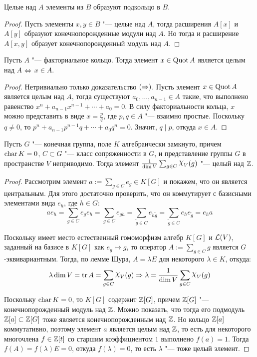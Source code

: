 \begin{corollary}
	Целые над $A$ элементы из $B$ образуют подкольцо в $B$.
\end{corollary}

\begin{proof}
	Пусть элементы $x, y \in B$ "--- целые над $A$, тогда расширения $A[x]$ и $A[y]$ образуют конечнопорожденные модули над $A$. Но тогда и расширение $A[x, y]$ образует конечнопорожденный модуль над $A$.
\end{proof}

\begin{proposition}
	Пусть $A$ "--- факториальное кольцо. Тогда элемент $x \in \operatorname{Quot}{A}$ является целым над $A$ $\Leftrightarrow$ $x \in A$.
\end{proposition}

\begin{proof}
	Нетривиально только доказательство $(\Rightarrow)$. Пусть элемент $x \in \operatorname{Quot}{A}$ является целым над $A$, тогда существуют $a_0, \dotsc, a_{n-1} \in A$ такие, что выполнено равенство $x^n + a_{n-1}x^{n-1} + \dotsb + a_0 = 0$. В силу факториальности кольца, $x$ можно представить в виде $x = \frac pq$, где $p, q \in A$ "--- взаимно простые. Поскольку $q \ne 0$, то $p^n + a_{n-1}{p^{n- 1}}q + \dotsb + a_0q^n = 0$. Значит, $q \mid p$, откуда $x \in A$.
\end{proof}

\begin{proposition}
	Пусть $G$ "--- конечная группа, поле $K$ алгебраически замкнуто, причем $\operatorname{char}{K} = 0$, $C \subset G$ "--- класс сопряженности в $G$, и представление группы $G$ в пространстве $V$ неприводимо. Тогда элемент $\frac1{\dim{V}}\sum_{g \in C}\Chi_V(g)$ "--- целый над $\mathbb{Z}$.
\end{proposition}

\begin{proof}
	Рассмотрим элемент $a := \sum_{g \in C}e_g \in K[G]$ и покажем, что он является центральным. Для этого достаточно проверить, что он коммутирует с базисными элементами вида $e_h$, где $h \in G$:
	\[ae_h = \sum_{g \in C}e_ge_h = \sum_{g \in C}e_{gh} = \sum_{\widetilde g \in C}e_{h\widetilde g} = \sum_{\widetilde g \in C}e_{h}e_{\widetilde g} = e_ha\]
	
	Поскольку имеет место естественный гомоморфизм алгебр $K[G]$ и $\mathcal L(V)$, заданный на базисе в $K[G]$ как $e_g \mapsto g$, то оператор $A := \sum_{g \in C}{g}$ является $G$-эквивариантным. Тогда, по лемме Шура, $A = \lambda E$ для некоторого $\lambda \in K$, откуда:
	\[\lambda\dim{V} = \tr{A} = \sum_{g \in C}\Chi_V(g) \ra \lambda = \frac1{\dim{V}}\sum_{g \in C}\Chi_V(g)\]
	
	Поскольку $\operatorname{char}{K} = 0$, то $K[G]$ содержит $\mathbb{Z}[G]$, причем $\mathbb{Z}[G]$ "--- конечнопорожденный модуль над $\mathbb{Z}$. Можно показать, что тогда его подмодуль $\mathbb{Z}[a] \subset \mathbb{Z}[G]$ тоже является конечнопорожденным над $\mathbb{Z}$. Но кольцо $\mathbb{Z}[a]$ коммутативно, поэтому элемент $a$ является целым над $\mathbb{Z}$, то есть для некоторого многочлена $f \in \mathbb{Z}[t]$ со старшим коэффициентом $1$ выполнено $f(a) = 1$. Тогда $f(A) = f(\lambda)E = 0$, откуда $f(\lambda) = 0$, то есть $\lambda$ "--- тоже целый элемент.
\end{proof}

